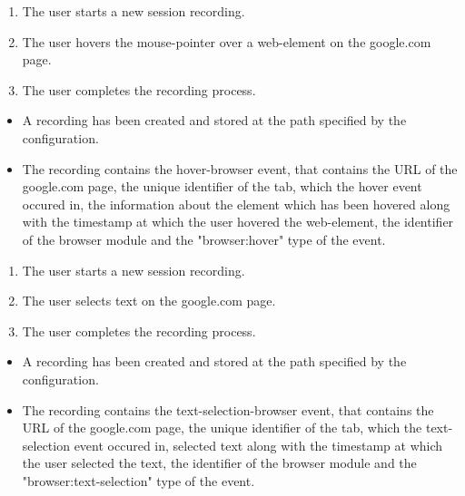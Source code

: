 \begin{tests}
	
	{\begin{enumerate}
		\item The \gls{user} starts a new \gls{session} recording.
		\item The \gls{user} hovers the mouse-pointer over a web-element on the google.com page.
		\item The \gls{user} completes the recording process.
	\end{enumerate}}
	{\begin{itemize}
		\item A recording has been created and stored at the path specified by the configuration.
		\item The recording contains the hover-browser \gls{event},  that contains the URL of the google.com page, the unique identifier of the tab, which the hover \gls{event} occured in, the information about the element which has been hovered along with the timestamp at which the \gls{user} hovered the web-element, the identifier of the \gls{browser} module and the "browser:hover" type of the event.
	\end{itemize}}
	
\newpage
	{\begin{enumerate}
		\item The \gls{user} starts a new \gls{session} recording.
		\item The \gls{user} selects text on the google.com page.
		\item The \gls{user} completes the recording process.
	\end{enumerate}}
	{\begin{itemize}
		\item A recording has been created and stored at the path specified by the configuration.
		\item The recording contains the text-selection-browser \gls{event},  that contains the URL of the google.com page, the unique identifier of the tab, which the text-selection \gls{event} occured in, selected text along with the timestamp at which the \gls{user} selected the text, the identifier of the \gls{browser} module and the "browser:text-selection" type of the event.
	\end{itemize}}
	

\end{tests}
